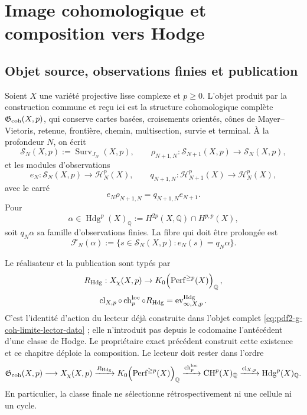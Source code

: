 \chapter{Image cohomologique et composition vers Hodge}

\section{Objet source, observations finies et publication}

Soient $X$ une variété projective lisse complexe et $p\ge0$. L'objet produit par
la construction commune et reçu ici est la structure cohomologique complète
$\mathfrak G_{\rm coh}(X,p)$, qui conserve
cartes basées, croisements orientés, cônes de Mayer--Vietoris, retenue,
frontière, chemin, multisection, survie et terminal. À la profondeur $N$, on
écrit
\begin{equation}\label{eq:pdf2-hodge-sistemas}
 \mathscr S_N(X,p):=\operatorname{Surv}_{J_N}(X,p),
 \qquad
 \rho_{N+1,N}:\mathscr S_{N+1}(X,p)\to\mathscr S_N(X,p),
\end{equation}
et les modules d'observations
\begin{equation}\label{eq:pdf2-hodge-observaciones}
 e_N:\mathscr S_N(X,p)\to\mathscr H_N^p(X),
 \qquad
 q_{N+1,N}:\mathscr H_{N+1}^p(X)\to\mathscr H_N^p(X),
\end{equation}
avec le carré
\begin{equation}\label{eq:pdf2-hodge-cuadrado-restriccion}
 e_N\rho_{N+1,N}=q_{N+1,N}e_{N+1}.
\end{equation}
Pour
\[
 \alpha\in\operatorname{Hdg}^p(X)_{\mathbb Q}
 :=H^{2p}(X,\mathbb Q)\cap H^{p,p}(X),
\]
soit $q_N\alpha$ sa famille d'observations finies. La fibre qui doit
être prolongée est
\begin{equation}\label{eq:pdf2-hodge-fibra-alpha}
 \mathscr F_N(\alpha):=
 \{s\in\mathscr S_N(X,p):e_N(s)=q_N\alpha\}.
\end{equation}

Le réalisateur et la publication sont typés par
\begin{equation}\label{eq:pdf2-hodge-realizador}
 R_{\rm Hdg}:X_\chi(X,p)\to
 K_0\!\left(\operatorname{Perf}^{\ge p}(X)\right)_{\mathbb Q},
\end{equation}
\begin{equation}\label{eq:pdf2-hodge-publicacion}
 \operatorname{cl}_{X,p}\circ\operatorname{ch}^{\rm loc}_p
 \circ R_{\rm Hdg}
 =\operatorname{ev}^{\rm Hdg}_{\infty,X,p}.
\end{equation}
C'est l'identité d'action du lecteur déjà construite dans l'objet complet
\eqref{eq:pdf2-g-coh-limite-lector-dato} ; elle n'introduit pas depuis le codomaine
l'antécédent d'une classe de Hodge. Le propriétaire exact précédent construit cette
existence et ce chapitre déploie la composition. Le lecteur
doit rester dans l'ordre
\[
 \mathfrak G_{\rm coh}(X,p)
 \longrightarrow X_\chi(X,p)
 \xrightarrow{R_{\rm Hdg}}
 K_0\!\left(\operatorname{Perf}^{\ge p}(X)\right)_{\mathbb Q}
 \xrightarrow{\operatorname{ch}^{\rm loc}_p}
 \operatorname{CH}^p(X)_{\mathbb Q}
 \xrightarrow{\operatorname{cl}_{X,p}}
 \operatorname{Hdg}^p(X)_{\mathbb Q}.
\]
En particulier, la classe finale ne sélectionne rétrospectivement ni une cellule ni
un cycle.

